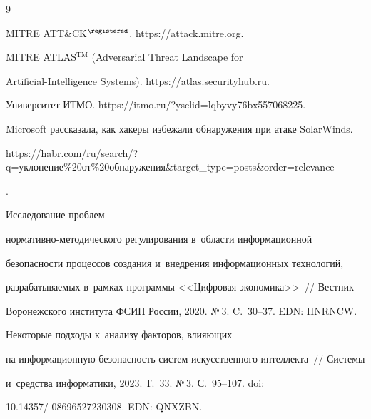 {\small\frenchspacing

{%


\begin{thebibliography}{9}




MITRE ATT\&CK$^\registered$. {\sf https://attack.mitre.org.}


MITRE ATLAS$^{\mathrm{TM}}$ (Adversarial Threat Landscape for  

Artificial-Intelligence Systems). {\sf https://atlas.securityhub.ru}.


Университет ИТМО. {\sf https://itmo.ru/?ysclid=lqbyvy76bx557068225}.


Microsoft рассказала, как хакеры избежали обнаружения при атаке SolarWinds. {\sf 

https://habr.com/ru/search/?q=уклонение\%20от\%20обнаружения\&target\_type=\linebreak posts\&order=relevance}. 




 Исследование проблем  

нор\-ма\-тив\-но-ме\-то\-ди\-че\-ско\-го регулирования в~об\-ласти информационной 

безопас\-ности процессов создания и~внед\-ре\-ния информационных технологий, 

разрабатываемых в~рамках программы <<Цифровая экономика>>~/\!\!/ Вестник 

Воронежского института ФСИН России, 2020. №\,3. C.~30--37. EDN: HNRNCW.


 Некоторые подходы к~анализу факторов, влияющих 

на информационную безопас\-ность сис\-тем искусственного интеллекта~/\!\!/ Сис\-те\-мы 

и~средства информатики, 2023. Т.~33. №\,3. С.~95--107. doi: 

10.14357\!/ 08696527230308. EDN: QNXZBN.

   \end{thebibliography}

} }







